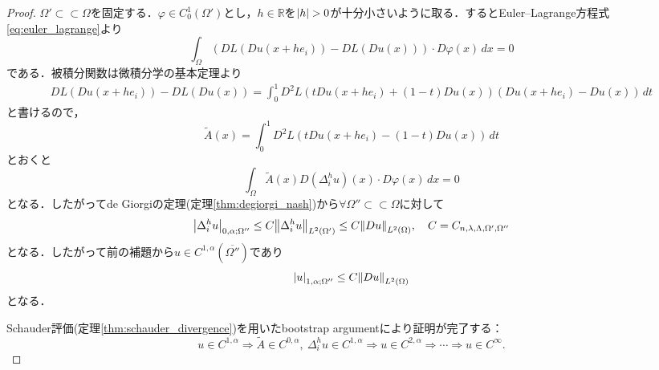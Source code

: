 \documentclass[a4paper]{ltjsarticle}
\newcommand{\Rset}{\mathbb{R}}
\newcommand{\Om}{\Omega}
\newcommand{\ssubset}{\subset\subset}
\newcommand{\1}{\mathbbm{1}}
\numberwithin{equation}{section}
\theoremstyle{definition}
\begin{document}
\begin{proof}
    $\Om'\ssubset \Om$を固定する．$\varphi\in C^1_0(\Om')$とし，$h\in\Rset$を$\abs{h}>0$が十分小さいように取る．するとEuler--Lagrange方程式\eqref{eq:euler_lagrange}より
    \begin{equation}
        \int_{\Om}(DL(Du(x+he_i))-DL(Du(x)))\cdot D\varphi(x)\,dx=0 
    \end{equation}
    である．被積分関数は微積分学の基本定理より
    \begin{align}
        DL(Du(x+he_i))-DL(Du(x))=\int_{0}^{1}D^2L(tDu(x+he_i)+(1-t)Du(x))(Du(x+he_i)-Du(x))\,dt
    \end{align}
    と書けるので，
    \begin{equation}
        \widetilde{A}(x)=\int_{0}^{1}D^2L(tDu(x+he_i)-(1-t)Du(x))\,dt
    \end{equation}
    とおくと
    \begin{equation}
        \int_{\Om}\widetilde{A}(x)D(\Delta^h_iu)(x)\cdot D\varphi(x)\,dx=0
    \end{equation}
    となる．したがってde Giorgiの定理(定理\ref{thm:degiorgi_nash})から$\forall \Om''\ssubset \Om$に対して
    \begin{equation}
        \abs{\Delta^h_i u}_{0,\alpha;\Om''}\leq C\norm{\Delta^h_i u}_{L^2(\Om')}\leq C\norm{Du}_{L^2(\Om )},\quad C=C_{n,\lambda,\Lambda,\Om',\Om''}
    \end{equation}
    となる．したがって前の補題から$u\in C^{1,\alpha}(\overline{\Om''})$であり
    \begin{equation}
        \abs{u}_{1,\alpha;\Om''}\leq C\norm{Du}_{L^2(\Om)}
    \end{equation}
    となる．

    Schauder評価(定理\ref{thm:schauder_divergence})を用いたbootstrap argumentにより証明が完了する：
    \begin{equation}
        u\in C^{1,\alpha}\Rightarrow \widetilde{A}\in C^{0,\alpha},\ \Delta^h_i u\in C^{1,\alpha}\Rightarrow u\in C^{2,\alpha}\Rightarrow \cdots\Rightarrow u\in C^{\infty}. 
    \end{equation}
\end{proof}
\end{document}
